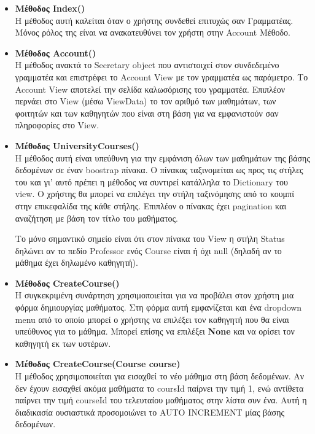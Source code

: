 \documentclass[12pt]{article}
\begin{document}
\begin{itemize}
	
	\item \textbf{Μέθοδος Index()}\\
	Η μέθοδος αυτή καλείται όταν ο χρήστης συνδεθεί επιτυχώς σαν Γραμματέας. Μόνος ρόλος της είναι να ανακατευθύνει τον χρήστη στην Account Μέθοδο.		
	
	\item \textbf{Μέθοδος Account()}\\
	Η μέθοδος ανακτά το Secretary object που αντιστοιχεί στον συνδεδεμένο γραμματέα και επιστρέφει το Account View με τον γραμματέα ως παράμετρο. Το Account View αποτελεί την σελίδα καλωσόρισης του γραμματέα. Επιπλέον περνάει στο View (μέσω ViewData) το τον αριθμό των μαθημάτων, των φοιτητών και των καθηγητών που είναι στη βάση για να εμφανιστούν σαν πληροφορίες στο View.
	
	\item \textbf{Μέθοδος UniversityCourses()}\\
	Η μέθοδος αυτή είναι υπεύθυνη για την εμφάνιση όλων των μαθημάτων της βάσης δεδομένων σε έναν boostrap πίνακα. Ο πίνακας ταξινομείται ως προς τις στήλες του και γι' αυτό πρέπει η μέθοδος να συντιρεί κατάλληλα το Dictionary του view. Ο χρήστης θα μπορεί να επιλέγει την στήλη ταξινόμησης από το κουμπί στην επικεφαλίδα της κάθε στήλης. Επιπλέον ο πίνακας έχει pagination και αναζήτηση με βάση τον τίτλο του μαθήματος.
	
	Το μόνο σημαντικό σημείο είναι ότι στον πίνακα του View η στήλη Status δηλώνει αν το πεδίο Professor ενός Course είναι ή όχι null (δηλαδή αν το μάθημα έχει δηλωμένο καθηγητή).
	
	\item \textbf{Μέθοδος CreateCourse()}\\
	Η συγκεκριμένη συνάρτηση χρησιμοποιείται για να προβάλει στον χρήστη μια φόρμα δημιουργίας μαθήματος. Στη φόρμα αυτή εμφανίζεται και ένα dropdown menu από το οποίο μπορεί ο χρήστης να επιλέξει τον καθηγητή που θα είναι υπεύθυνος για το μάθημα. Μπορεί επίσης να επιλέξει \textbf{None} και να ορίσει τον καθηγητή εκ των υστέρων. 

	\item \textbf{Μέθοδος CreateCourse(Course course)}\\
	Η μέθοδος χρησιμοποιείται για εισαχθεί το νέο μάθημα στη βάση δεδομένων. Αν δεν έχουν εισαχθεί ακόμα μαθήματα το coursId παίρνει την τιμή 1, ενώ αντίθετα παίρνει την τιμή courseId του τελευταίου μαθήματος στην λίστα συν ένα. Αυτή η διαδικασία ουσιαστικά προσομοιώνει το AUTO INCREMENT μίας βάσης δεδομένων.
	

\end{itemize}
\end{document}
